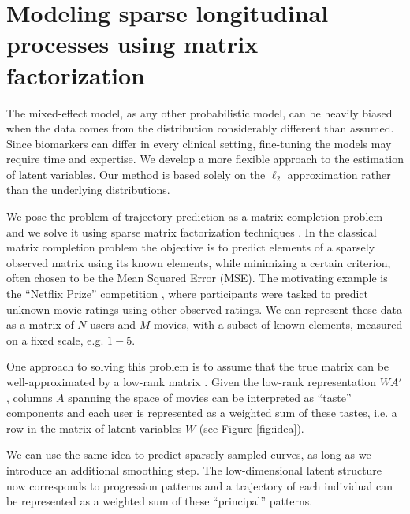 \documentclass[preprint]{imsart}
\numberwithin{equation}{section}
\theoremstyle{plain}
\begin{document}

\section{Modeling sparse longitudinal processes using matrix factorization}\label{s:context}


The mixed-effect model, as any other probabilistic model, can be heavily biased when the data comes from the distribution considerably different than assumed. Since biomarkers can differ in every clinical setting, fine-tuning the models may require time and expertise. We develop a more flexible approach to the estimation of latent variables. Our method is based solely on the $\ell_2$ approximation rather than the underlying distributions.

We pose the problem of trajectory prediction as a matrix completion problem and we solve it using sparse matrix factorization techniques \citep{rennie2005fast, candes2009exact}. In the classical matrix completion problem the objective is to predict elements of a sparsely observed matrix using its known elements, while minimizing a certain criterion, often chosen to be the Mean Squared Error (MSE). The motivating example is the ``Netflix Prize'' competition \citep{bennett2007netflix}, where participants were tasked to predict unknown movie ratings using other observed ratings. We can represent these data as a matrix of $N$ users and $M$ movies, with a subset of known elements, measured on a fixed scale, e.g. $1-5$.

One approach to solving this problem is to assume that the true matrix can be well-approximated by a low-rank matrix \citep{srebro2005generalization}. Given the low-rank representation $WA'$, columns $A$ spanning the space of movies can be interpreted as ``taste'' components and each user is represented as a weighted sum of these tastes, i.e. a row in the matrix of latent variables $W$ (see Figure \ref{fig:idea}).

We can use the same idea to predict sparsely sampled curves, as long as we introduce an additional smoothing step. The low-dimensional latent structure now corresponds to progression patterns and a trajectory of each individual can be represented as a weighted sum of these ``principal'' patterns.
\end{document}
